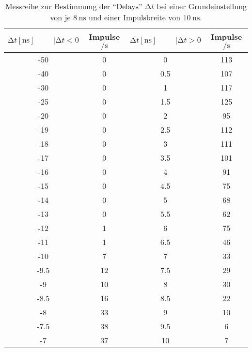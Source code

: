 \begin{table}
    \centering
    \caption{Messreihe zur Bestimmung der \enquote{Delays} $\increment t$ bei einer Grundeinstellung von je $\SI{8}{\nano\second}$ und einer Impulsbreite von $\SI{10}{\nano\second}$. } 
    \label{tab:MessreiheDelay10ns}
    \begin{tabular}{c c || c c}
        \toprule
        $\increment t [\si{\nano\second}] \hspace{1cm}|\increment t < 0 $ & Impulse $\si{\per\second} $ & $\increment t [\si{\nano\second}] \hspace{1cm}|\increment t > 0 $ & Impulse $\si{\per\second}$ \\
        \midrule
        -50    &   0      &    0       &   113    \\
        -40    &   0      &    0.5     &   107    \\
        -30    &   0      &    1       &   117    \\
        -25    &   0      &    1.5     &   125    \\
        -20    &   0      &    2       &   95    \\
        -19    &   0      &    2.5     &   112    \\
        -18    &   0      &    3       &   111    \\
        -17    &   0      &    3.5     &   101    \\
        -16    &   0      &    4       &   91    \\
        -15    &   0      &    4.5     &   75    \\
        -14    &   0      &    5       &   68    \\
        -13    &   0      &    5.5     &   62    \\
        -12    &   1      &    6       &   75    \\
        -11    &   1      &    6.5     &   46    \\
        -10    &   7      &    7       &   33    \\
        -9.5   &   12     &    7.5     &   29    \\
        -9     &   10     &    8       &   30    \\
        -8.5   &   16     &    8.5     &   22    \\
        -8     &   33     &    9       &   10    \\
        -7.5   &   38     &    9.5     &   6    \\
        -7     &   37     &    10      &   7    \\

\end{tabular}
\end{table}
